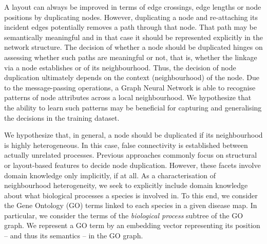 \documentclass[
	fontsize=10pt, %
	twoside=false, %
	secnumdepth=1, %
  toc=indentunnumbered %
]{kaobook}
\begin{document}
A layout can always be improved in terms of edge crossings, edge lengths or node
positions by duplicating nodes. However, duplicating a node and re-attaching its
incident edges potentially removes a path through that node. That path
may be semantically meaningful and in that case it should be represented
explicitly in the network structure.
The decision of whether a node should be duplicated hinges on
assessing whether such paths are meaningful or not, that is, whether the linkage via
a node establishes  or  of its neighbourhood.
Thus, the decision of node duplication ultimately depends on the context
(neighbourhood) of the node.
%
Due to the message-passing operations, a Graph Neural
Network is able to recognise patterns of node attributes across a local
neighbourhood. We hypothesize that the ability to learn such patterns may be
beneficial for capturing and generalising the decisions in the training dataset.



We hypothesize that, in general, a node should be duplicated if its
neighbourhood is highly heterogeneous. In this case, false connectivity is
established between actually unrelated processes.
Previous approaches commonly focus on structural or layout-based features to
decide node duplication.
However, these facets involve domain knowledge only implicitly, if at all.
As a characterisation of neighbourhood heterogeneity, we seek
to explicitly include domain knowledge about what biological processes a species
is involved in. To this end, we consider the Gene Ontology (GO) terms linked to each
species in a given disease map. In particular, we consider the terms of the
\textit{biological process} subtree of the GO graph.
%
We represent a GO term by an embedding vector representing its position -- and
thus its semantics -- in the GO graph.
\end{document}
